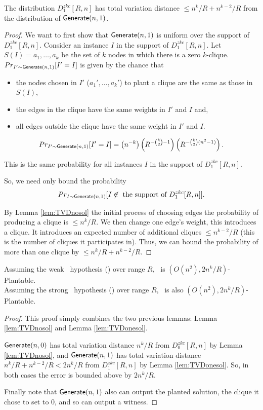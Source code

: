 \begin{lemma}
	The distribution $D^{zkc}_{1}[R,n]$ has total variation distance $\leq n^k/R+n^{k-2}/R$ from the distribution of $\mathsf{Generate}(n,1)$.
	\label{lem:TVDonesol}
\end{lemma}
\begin{proof}
	We want to first show that $\mathsf{Generate}(n,1)$ is uniform over the support of $D^{zkc}_{1}[R,n]$. Consider an instance $I$ in the support of $D^{zkc}_{1}[R,n]$. Let $S(I) = {a_1, \ldots , a_k}$ be the set of $k$ nodes in which there is a zero $k$-clique. $Pr_{I' \sim \mathsf{Generate}(n,1)}[I' = I]$ is given by the chance that
	\begin{itemize}
		\item the nodes chosen in $I'$ ($a_1',\ldots, a_k'$) to plant a clique are the same as those in $S(I)$,
		\item the edges in the clique have the same weights in $I'$ and $I$ and,
		\item all edges outside the clique have the same weight in $I'$ and $I$. 
	\end{itemize}
	$$Pr_{I' \sim \mathsf{Generate}(n,1)}[I' = I] = \left(n^{-k} \right)  \left(R^{-\binom{k}{2}-1} \right)  \left(R^{-\binom{k}{2}(n^2-1)} \right) .$$
	
	This is the same probability for all instances $I$ in the support of $D^{zkc}_{1}[R,n]$. 
	
	So, we need only bound the probability 
	$$Pr_{I \sim \mathsf{Generate}(n,1)}[I \not\in \text{ the support of } D^{zkc}_{1}[R,n]].$$
	
	By Lemma \ref{lem:TVDnosol} the initial process of choosing edges the probability of producing a clique is $\leq n^k/R$. We then change one edge's weight, this introduces a clique. It introduces an expected number of additional cliques $\leq n^{k-2}/R$ (this is the number of cliques it participates in). Thus, we can bound the probability of more than one clique by $\leq n^k/R+n^{k-2}/R$.
\end{proof}



\begin{theorem}\label{thm:zkcPlantable}
	Assuming the weak \zkclique~hypothesis (\ACIH) over range $R$, \zkclique~is $(O(n^2), 2n^k/R)$-Plantable.\\
	Assuming the strong \zkclique~hypothesis (\ACSH) over range $R$, \zkclique~is also $(O(n^2), 2n^k/R)$-Plantable.
\end{theorem}
\begin{proof}
	This proof simply combines the two previous lemmas: Lemma \ref{lem:TVDnosol} and Lemma \ref{lem:TVDonesol}.
	
	$\mathsf{Generate}(n,0)$ has total variation distance $n^k/R$ from $D^{zkc}_{0}[R,n]$ by Lemma \ref{lem:TVDnosol}, and $\mathsf{Generate}(n,1)$ has total variation distance $n^k/R+n^{k-2}/R < 2n^k/R$ from $D^{zkc}_1[R,n]$ by Lemma \ref{lem:TVDonesol}. So, in both cases the error is bounded above by $2n^k/R$.
	
	
	
	Finally note that $\mathsf{Generate}(n,1)$ also can output the planted solution, the clique it chose to set to 0, and so can output a witness.
\end{proof}


